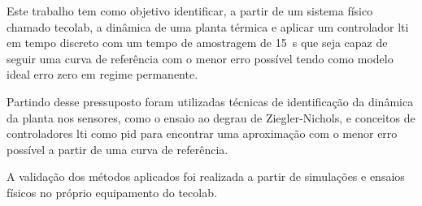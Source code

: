Este trabalho tem como objetivo identificar, a partir de um sistema físico
chamado \gls{tecolab}, a dinâmica de uma planta térmica e aplicar um controlador
\gls{lti} em tempo discreto com um tempo de amostragem de \SI{15}{\second} que
seja capaz de seguir uma curva de referência com o menor erro possível tendo
como modelo ideal erro zero em regime permanente.

Partindo desse pressuposto foram utilizadas técnicas de identificação da
dinâmica da planta nos sensores, como o ensaio ao degrau de Ziegler-Nichols, e
conceitos de controladores \gls{lti} como \gls{pid} para encontrar uma
aproximação com o menor erro possível a partir de uma curva de referência.

A validação dos métodos aplicados foi realizada a partir de simulações e ensaios
físicos no próprio equipamento do \gls{tecolab}.
